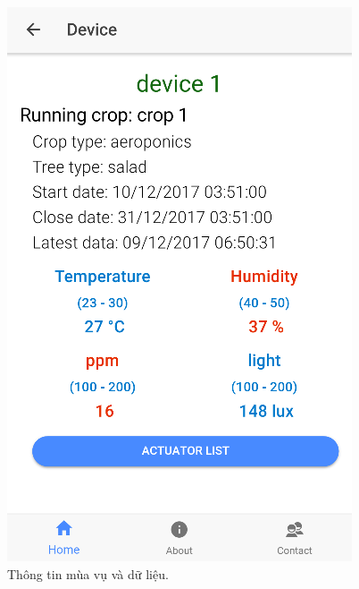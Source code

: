 \documentclass[a4paper,12pt,oneside]{article}
\begin{document}
\begin{figure}[H]
\centering
\includegraphics[scale=.7]{hinh/mobile_crop.png}
\caption{Thông tin mùa vụ và dữ liệu.}
\end{figure}
\end{document}
